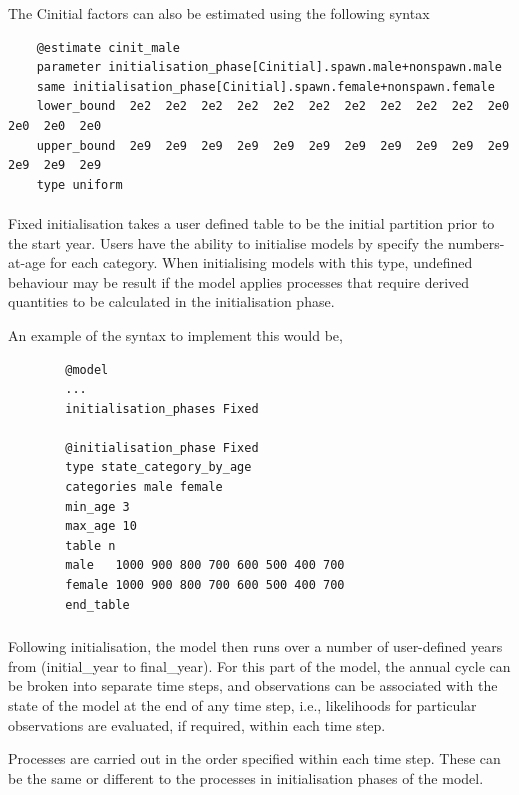 The Cinitial factors can also be estimated using the following syntax

{\small{\begin{verbatim}
	@estimate cinit_male
	parameter initialisation_phase[Cinitial].spawn.male+nonspawn.male
	same initialisation_phase[Cinitial].spawn.female+nonspawn.female
	lower_bound  2e2  2e2  2e2  2e2  2e2  2e2  2e2  2e2  2e2  2e2  2e0  2e0  2e0  2e0
	upper_bound  2e9  2e9  2e9  2e9  2e9  2e9  2e9  2e9  2e9  2e9  2e9  2e9  2e9  2e9
	type uniform
	\end{verbatim}}}

\paragraph{}

Fixed initialisation takes a user defined table to be the initial partition prior to the start year. Users have the ability to initialise models by specify the numbers-at-age for each category. When initialising models with this type, undefined behaviour may be result if the model applies processes that require derived quantities to be calculated in the initialisation phase.

An example of the syntax to implement this would be,
{\small{\begin{verbatim}
		@model
		...
		initialisation_phases Fixed

		@initialisation_phase Fixed
		type state_category_by_age
		categories male female
		min_age 3
		max_age 10
		table n
		male   1000 900 800 700 600 500 400 700
		female 1000 900 800 700 600 500 400 700
		end_table
		\end{verbatim}}}

\subsubsection{}

Following initialisation, the model then runs over a number of user-defined years from (initial\_year to final\_year). For this part of the model, the annual cycle can be broken into separate time steps, and observations can be associated with the state of the model at the end of any time step, i.e., likelihoods for particular observations are evaluated, if required, within each time step.

Processes are carried out in the order specified within each time step. These can be the same or different to the processes in initialisation phases of the model.

